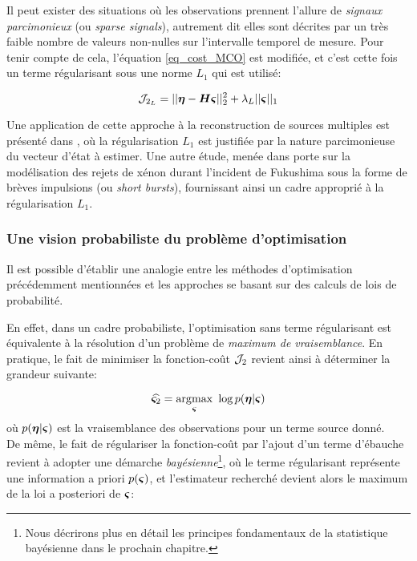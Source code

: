 Il peut exister des situations où les observations prennent l'allure de \textit{signaux parcimonieux} (ou \textit{sparse signals}), autrement dit elles sont décrites par un très faible nombre de valeurs non-nulles sur l'intervalle temporel de mesure. Pour tenir compte de cela, l'équation \eqref{eq_cost_MCO} est modifiée, et c'est cette fois un terme régularisant sous une norme $L_1$ qui est utilisé: 

\begin{equation}
\mathcal{J}_{2_L} = ||{\bm{\eta}} - {\bm{H}}{\bm{\varsigma}}||_2^2 + \lambda_L ||{\bm{\varsigma}}||_1
\label{eq_MCO_L1}
\end{equation}

Une application de cette approche à la reconstruction de sources multiples est présenté dans \cite{Cheng2008}, où la régularisation $L_1$ est justifiée par la nature parcimonieuse du vecteur d'état à estimer. Une autre étude, menée dans \cite{Martinez2013} porte sur la modélisation des rejets de xénon durant l'incident de Fukushima sous la forme de brèves impulsions (ou \textit{short bursts}), fournissant ainsi un cadre approprié à la régularisation $L_1$.

\subsubsection{Une vision probabiliste du problème d'optimisation}

Il est possible d'établir une analogie entre les méthodes d'optimisation précédemment mentionnées et les approches se basant sur des calculs de lois de probabilité.

En effet, dans un cadre probabiliste, {l'optimisation sans terme régularisant est équivalente à la résolution d'un} problème de \textit{maximum de vraisemblance}. En pratique, le fait de minimiser la fonction-coût ${\mathcal{J}}_2$ revient ainsi à déterminer la grandeur suivante:

\begin{equation}
{
\widehat{{\bm{\varsigma}}_2} = \operatorname*{\arg\!\max}_{\bm{\varsigma}}~ \log p({\bm{\eta}}| {\bm{\varsigma}})
\label{eq_ML_MCO}
}
\end{equation}
où $p({\bm{\eta}} | {\bm{\varsigma}})$ est la vraisemblance des observations pour un terme source donné. \\

De même, le fait de régulariser la fonction-coût par l'ajout d'un terme d'ébauche revient à adopter une démarche \textit{bayésienne}\footnote{Nous décrirons plus en détail les principes fondamentaux de la statistique bayésienne dans le prochain chapitre.}, où le terme régularisant représente une information a priori $p({\bm{\varsigma}})$, et l'estimateur recherché devient alors le maximum de la loi a posteriori de ${\bm{\varsigma}}$: 

